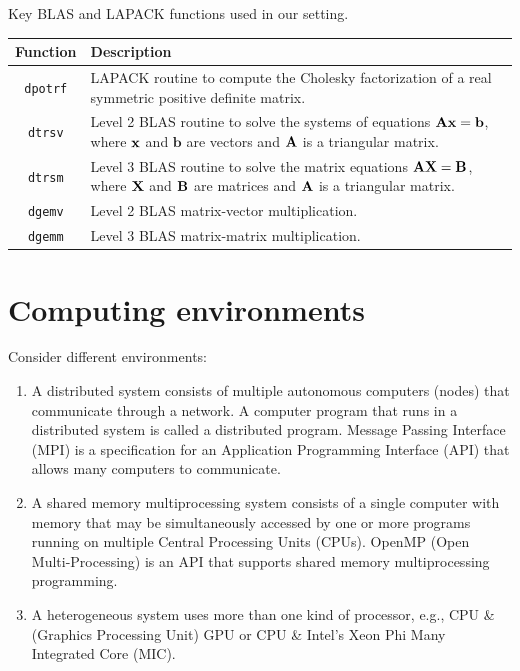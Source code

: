 \documentclass[10pt, xcolor=table]{beamer}
\newcommand{\bb}{\textbf{b}}
\newcommand{\blue}[1]{{\color{RoyalBlue!90} #1}}
\begin{document}
\begin{frame}
Key BLAS and LAPACK functions used in our setting.

\begin{table}[!ht]
\centering
\begin{tabularx}{\linewidth}{ c X }
  \hline
 Function& Description\\ 
  \hline
  \texttt{dpotrf} &LAPACK routine to compute the Cholesky factorization of a real symmetric positive definite matrix.\\
  \texttt{dtrsv} & Level 2 BLAS routine to solve the systems of equations $\bA\bx = \bb$, where $\textbf{x}$ and $\bb$ are vectors and $\textbf{A}$ is a triangular matrix.\\
  \texttt{dtrsm} & Level 3 BLAS routine to solve the matrix equations $\textbf{A}\textbf{X} = \textbf{B}$, where $\textbf{X}$ and $\textbf{B}$ are matrices and $\textbf{A}$ is a triangular matrix.\\
  \texttt{dgemv} & Level 2 BLAS matrix-vector multiplication.\\
  \texttt{dgemm} & Level 3 BLAS matrix-matrix multiplication.\\
   \hline
\end{tabularx}
\end{table}
\end{frame}


\section{Computing environments}
\begin{frame}
Consider different environments:
\begin{enumerate}\setlength{\itemsep}{0.2cm}
	\item A \blue{distributed system} consists of multiple autonomous computers (nodes) that communicate through a network. A computer program that runs in a distributed system is called a distributed program. Message Passing Interface (MPI) is a specification for an Application Programming Interface (API) that allows many computers to communicate.\pause
\item A \blue{shared memory multiprocessing system} consists of a
single computer with memory that may be simultaneously
accessed by one or more programs running on multiple
Central Processing Units (CPUs). OpenMP (Open
Multi-Processing) is an API that supports shared memory
multiprocessing programming.
\item A \blue{heterogeneous system} uses more than one kind of processor, e.g., CPU \& (Graphics Processing Unit) GPU or CPU \& Intel's Xeon Phi Many Integrated Core (MIC). 
\end{enumerate}
\end{frame}
\end{document}
